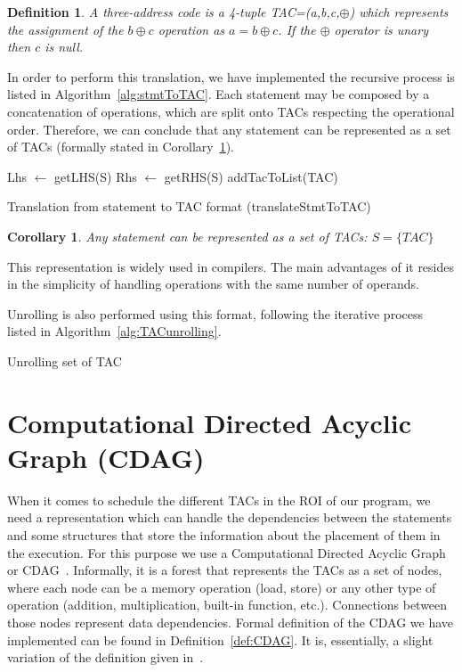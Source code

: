 \documentclass[a4paper,12pt]{memoir}
\newtheorem{definition}{Definition}[]
\newtheorem{corollary}{Corollary}[]
\begin{document}
\theoremstyle{definition}
\begin{definition}\label{def:TAC}
	A three-address code is a 4-tuple TAC=(a,b,c,$\oplus$) which represents the 
	assignment of the $b \oplus c$ operation as $a
	= 
	b \oplus c$. If the $\oplus$ operator is unary then $c$ is null.
\end{definition}

In order to perform this translation, we have implemented the recursive process 
is listed in 
Algorithm~\ref{alg:stmtToTAC}. Each statement may be composed by a 
concatenation of operations, which are split onto TACs respecting the 
operational order. Therefore, we can conclude that any statement 
can be represented as a set of TACs (formally stated in 
Corollary~\ref{cor:TAC}).

\begin{algorithm}[H]\label{alg:stmtToTAC}
	\SetAlgoLined
	Lhs $\leftarrow$ getLHS(S)\;
	Rhs $\leftarrow$ getRHS(S)\;
	addTacToList(TAC)\;
	\caption{Translation from statement to TAC format (translateStmtToTAC)}
\end{algorithm}

\begin{corollary}\label{cor:TAC}
	Any statement can be represented as a set of TACs:
	$S = \{TAC\}$
\end{corollary}

This representation is widely used in compilers. The main advantages of it 
resides in the simplicity of handling operations with the same number of 
operands. 

Unrolling is also performed using this format, following the iterative process 
listed in 
Algorithm~\ref{alg:TACunrolling}.

\begin{algorithm}[H]\label{alg:TACunrolling}
	\SetAlgoLined
	\caption{Unrolling set of TAC}
\end{algorithm}


\section{Computational Directed Acyclic Graph (CDAG)}
When it comes to schedule the different TACs in the ROI of our program, we need
a representation which can handle the dependencies between the statements and
some structures that store the information about the placement of them in the
execution. For this purpose we use a Computational Directed Acyclic Graph or 
CDAG~\cite{bib:CDAGdefinition}. Informally, it is a forest that represents the 
TACs as a set of nodes, where 
each node can be a memory operation (load, store) or any other type of 
operation (addition, multiplication, built-in function, etc.). Connections 
between those nodes represent data dependencies. Formal 
definition of the CDAG we have implemented can be found in 
Definition~\ref{def:CDAG}. It is, essentially, a slight variation 
of the definition given in~\cite{bib:CDAGdefinition}.
\end{document}
